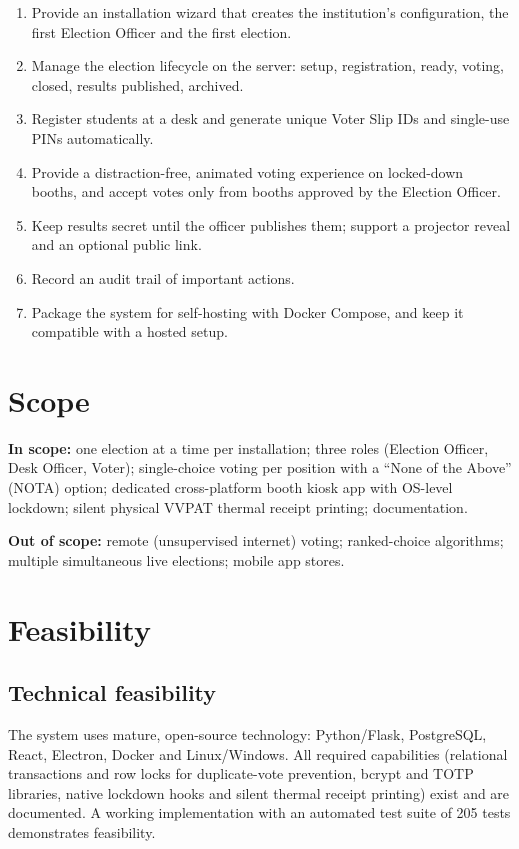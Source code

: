\begin{enumerate}
  \item Provide an installation wizard that creates the institution's configuration, the first Election Officer and the first election.
  \item Manage the election lifecycle on the server: setup, registration, ready, voting, closed, results published, archived.
  \item Register students at a desk and generate unique Voter Slip IDs and single-use PINs automatically.
  \item Provide a distraction-free, animated voting experience on locked-down booths, and accept votes only from booths approved by the Election Officer.
  \item Keep results secret until the officer publishes them; support a projector reveal and an optional public link.
  \item Record an audit trail of important actions.
  \item Package the system for self-hosting with Docker Compose, and keep it compatible with a hosted setup.
\end{enumerate}

\section{Scope}

\textbf{In scope:} one election at a time per installation; three roles (Election Officer, Desk Officer, Voter); single-choice voting per position with a ``None of the Above'' (NOTA) option; dedicated cross-platform booth kiosk app with OS-level lockdown; silent physical VVPAT thermal receipt printing; documentation.

\textbf{Out of scope:} remote (unsupervised internet) voting; ranked-choice algorithms; multiple simultaneous live elections; mobile app stores.

\section{Feasibility}

\subsection{Technical feasibility}

The system uses mature, open-source technology: Python/Flask, PostgreSQL, React, Electron, Docker and Linux/Windows. All required capabilities (relational transactions and row locks for duplicate-vote prevention, bcrypt and TOTP libraries, native lockdown hooks and silent thermal receipt printing) exist and are documented. A working implementation with an automated test suite of 205 tests demonstrates feasibility.

